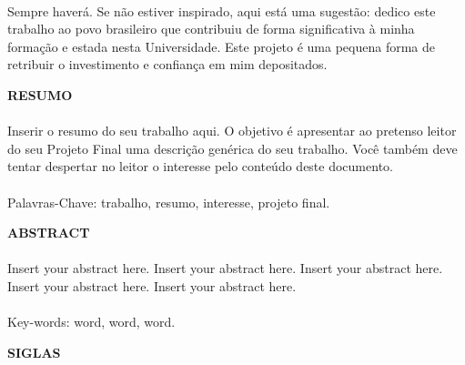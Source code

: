\paragraph{}Sempre haverá. Se não estiver inspirado, aqui está uma sugestão: dedico este trabalho ao povo brasileiro que contribuiu de forma significativa à minha formação e estada nesta Universidade. Este projeto é uma pequena forma de retribuir o investimento e confiança em mim depositados.

\pagebreak


\begin{center}
\textbf{RESUMO}
\end{center}
      \vspace{0.5cm}

\paragraph{}Inserir o resumo do seu trabalho aqui. O objetivo é apresentar ao pretenso leitor do seu Projeto Final uma descrição genérica do seu trabalho. Você também deve tentar despertar no leitor o interesse pelo conteúdo deste documento.
\paragraph{}
\noindent Palavras-Chave: trabalho, resumo, interesse, projeto final.

\pagebreak


\begin{center}
\textbf{ABSTRACT}
\end{center}
      \vspace{0.5cm}

\paragraph{}Insert your abstract here. Insert your abstract here. Insert your abstract here. Insert your abstract here. Insert your abstract here.
\paragraph{}
\noindent Key-words: word, word, word.

\pagebreak


\begin{center}
\textbf{SIGLAS}
\end{center}
      \vspace{0.5cm}


